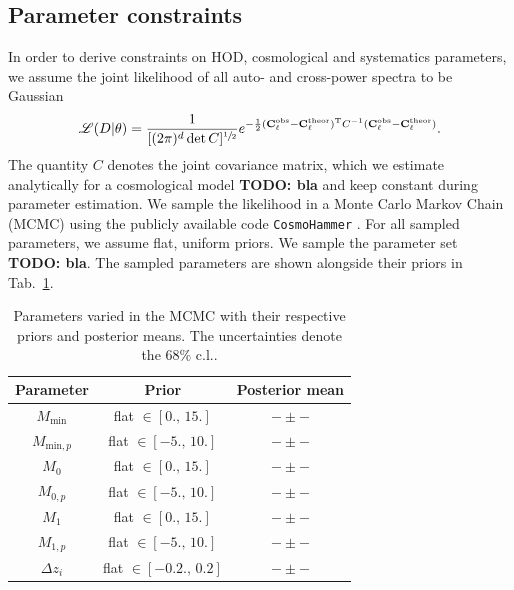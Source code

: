 \documentclass[a4paper,11pt]{article}
\newcommand{\todo}[1]{{\bf TODO: #1}}
\newcommand\Tstrut{\rule{0pt}{3ex}}
\begin{document}
  \subsection{Parameter constraints}\label{ssec:methods.constr}
    In order to derive constraints on HOD, cosmological and systematics parameters, we assume the joint likelihood of all auto- and cross-power spectra to be Gaussian 
    \begin{align}
      \mathscr{L}(D \vert \theta) = \frac{1}{[(2\pi)^{d}\det{C}]^{\sfrac{1}{2}}} e^{-\frac{1}{2}(\mathbf{C}^{\mathrm{obs}}_{\ell}-\mathbf{C}^{\mathrm{theor}}_{\ell})^{\mathrm{T}}C^{-1}(\mathbf{C}^{\mathrm{obs}}_{\ell}-\mathbf{C}^{\mathrm{theor}}_{\ell})}.
      \label{eq:likelihood}
    \end{align}
    The quantity $C$ denotes the joint covariance matrix, which we estimate analytically for a cosmological model \todo{bla} and keep constant during parameter estimation.
    We sample the likelihood in a Monte Carlo Markov Chain (MCMC) using the publicly available code \texttt{CosmoHammer} \cite{Akeret:2013}. For all sampled parameters, we assume flat, uniform priors. We sample the parameter set \todo{bla}. The sampled parameters are shown alongside their priors in Tab.~\ref{tab:params}.

    \begin{table}
      \caption{Parameters varied in the MCMC with their respective priors and posterior means. The uncertainties denote the $68 \%$ c.l..} \label{tab:params}
      \begin{center}
        \begin{tabular}{ccc}
          \hline\hline 
          Parameter & Prior & Posterior mean\\ \hline \Tstrut                             
          $M_{\mathrm{min}}$ & flat $\in [0., \,15.]$ & $- \pm -$ \\ 
          $M_{\mathrm{min}, p}$ & flat $\in [-5., \,10.]$ & $- \pm -$ \\
          $M_{0}$ & flat $\in [0., \,15.]$ & $- \pm -$ \\
          $M_{0, p}$ & flat $\in [-5., \,10.]$ & $- \pm -$ \\
          $M_{1}$ & flat $\in [0., \,15.]$ & $- \pm -$ \\ 
          $M_{1, p}$ & flat $\in [-5., \,10.]$ & $- \pm -$ \\
          $\Delta z_{i}$ & flat $\in [-0.2., \,0.2]$ & $- \pm -$ \\
          \hline\hline 
        \end{tabular}
      \end{center}
    \end{table} 
\end{document}
